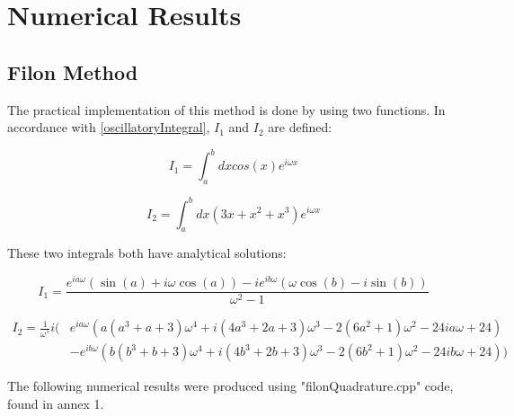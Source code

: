 \chapter{Numerical Results}

\section{Filon Method}

The practical implementation of this method is done by using two functions. In accordance with \eqref{oscillatoryIntegral}, $I_1$ and $I_2$ are defined:


\begin{equation}
      I_1=\int_a^{b}dx cos(x)e^{i\omega x}
\end{equation}

\begin{equation}
      I_2 =\int_a^{b}dx (3x+x^2+x^3)e^{i\omega x} 
\end{equation}

These two integrals both have analytical solutions:

\begin{equation}
  I_1=\frac{e^{i a \omega } (\sin (a)+i \omega  \cos (a))-i e^{i b \omega } (\omega  \cos (b)-i \sin (b))}{\omega ^2-1}
\end{equation}

\begin{equation}
  \begin{aligned}
    I_2=\frac{1}{\omega^5}i (&e^{i a \omega } (a (a^3+a+3) \omega ^4+i (4 a^3+2 a+3) \omega ^3-2 (6 a^2+1) \omega ^2-24 i a \omega +24)\\
                             &-e^{i b \omega } (b (b^3+b+3) \omega ^4+i (4 b^3+2 b+3) \omega ^3-2 (6 b^2+1) \omega ^2-24 i b \omega +24))
  \end{aligned}
\end{equation}

\vspace{3in}

\pagebreak

The following numerical results were produced using "filonQuadrature.cpp" code, found in annex 1.

